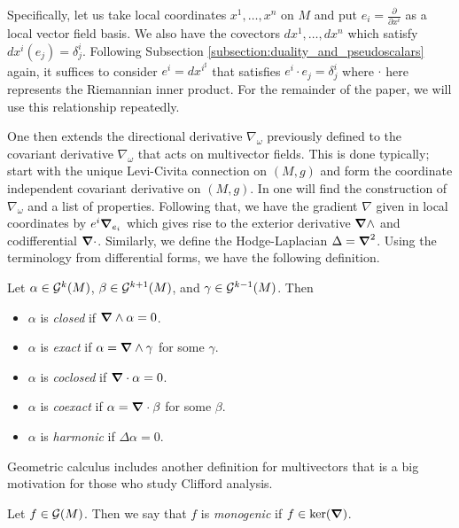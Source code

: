 \documentclass[12pt]{article}
\begin{document}
Specifically, let us take local coordinates $x^1,\dots,x^n$ on $M$ and put $e_i = \frac{\partial}{\partial x^i}$ as a local vector field basis.  We also have the covectors $dx^1,\dots,dx^n$ which satisfy $dx^i(e_j) = \delta^i_j$.   Following Subsection \ref{subsection:duality_and_pseudoscalars} again, it suffices to consider $e^i = dx^{i^\sharp}$ that satisfies $e^i \cdot e_j = \delta^i_j$ where $\cdot$ here represents the Riemannian inner product.  For the remainder of the paper, we will use this relationship repeatedly.

One then extends the directional derivative $\nabla_\omega$ previously defined to the covariant derivative $\nabla_\omega$ that acts on multivector fields. This is done typically; start with the unique Levi-Civita connection on $(M,g)$ and form the coordinate independent covariant derivative on $(M,g)$. In \cite{schindler_geometric_2020} one will find the construction of $\nabla_\omega$ and a list of properties.  Following that, we have the gradient $\nabla$ given in local coordinates by $e^i \boldsymbol{\nabla}_{e_i}$ which gives rise to the exterior derivative $\boldsymbol{\nabla} \wedge$ and codifferential $\boldsymbol{\nabla} \cdot$. Similarly, we define the Hodge-Laplacian $\Delta = \boldsymbol{\nabla}^2$. Using the terminology from differential forms, we have the following definition.

\begin{definition}
Let $\alpha \in \mathcal{G}^{k}(M)$, $\beta \in \mathcal{G}^{k+1}(M)$, and $\gamma \in \mathcal{G}^{k-1}(M)$.  Then
\begin{itemize}
    \item $\alpha$ is \emph{closed} if $\boldsymbol{\nabla} \wedge \alpha =0$.
    \item $\alpha$ is \emph{exact} if $\alpha = \boldsymbol{\nabla} \wedge \gamma$ for some $\gamma$.
    \item $\alpha$ is \emph{coclosed} if $\boldsymbol{\nabla} \cdot \alpha = 0$.
    \item $\alpha$ is \emph{coexact} if $\alpha = \boldsymbol{\nabla} \cdot \beta$ for some $\beta$.
    \item $\alpha$ is \emph{harmonic} if $\Delta \alpha =0$.
\end{itemize}
\end{definition}

Geometric calculus includes another definition for multivectors that is a big motivation for those who study Clifford analysis.  

\begin{definition}
 Let $f \in \mathcal{G}(M)$. Then we say that $f$ is \emph{monogenic} if $f \in \ker(\boldsymbol{\nabla})$.
\end{definition}
\end{document}

